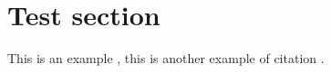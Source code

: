 \section{Test section}
\lipsum[1-2]

This is an example \cite{example_webpage}, this is another example of citation \cite{rieffel2011quantum}.